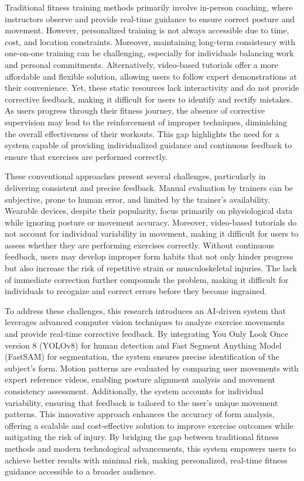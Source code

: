 \documentclass[conference]{IEEEtran}
\begin{document}
Traditional fitness training methods primarily involve in-person coaching, where instructors observe and provide real-time guidance to ensure correct posture and movement. However, personalized training is not always accessible due to time, cost, and location constraints. Moreover, maintaining long-term consistency with one-on-one training can be challenging, especially for individuals balancing work and personal commitments. Alternatively, video-based tutorials offer a more affordable and flexible solution, allowing users to follow expert demonstrations at their convenience. Yet, these static resources lack interactivity and do not provide corrective feedback, making it difficult for users to identify and rectify mistakes. As users progress through their fitness journey, the absence of corrective supervision may lead to the reinforcement of improper techniques, diminishing the overall effectiveness of their workouts. This gap highlights the need for a system capable of providing individualized guidance and continuous feedback to ensure that exercises are performed correctly.

These conventional approaches present several challenges, particularly in delivering consistent and precise feedback. Manual evaluation by trainers can be subjective, prone to human error, and limited by the trainer's availability. Wearable devices, despite their popularity, focus primarily on physiological data while ignoring posture or movement accuracy. Moreover, video-based tutorials do not account for individual variability in movement, making it difficult for users to assess whether they are performing exercises correctly. Without continuous feedback, users may develop improper form habits that not only hinder progress but also increase the risk of repetitive strain or musculoskeletal injuries. The lack of immediate correction further compounds the problem, making it difficult for individuals to recognize and correct errors before they become ingrained.

To address these challenges, this research introduces an AI-driven system that leverages advanced computer vision techniques to analyze exercise movements and provide real-time corrective feedback. By integrating You Only Look Once version 8 (YOLOv8) for human detection and Fast Segment Anything Model (FastSAM) for segmentation, the system ensures precise identification of the subject's form. Motion patterns are evaluated by comparing user movements with expert reference videos, enabling posture alignment analysis and movement consistency assessment. Additionally, the system accounts for individual variability, ensuring that feedback is tailored to the user's unique movement patterns. This innovative approach enhances the accuracy of form analysis, offering a scalable and cost-effective solution to improve exercise outcomes while mitigating the risk of injury. By bridging the gap between traditional fitness methods and modern technological advancements, this system empowers users to achieve better results with minimal risk, making personalized, real-time fitness guidance accessible to a broader audience.
\end{document}
